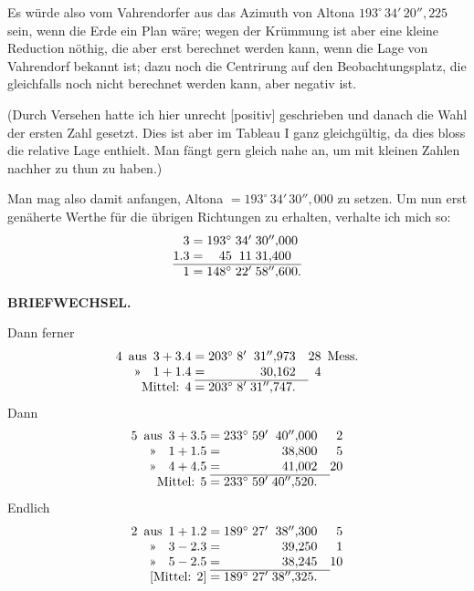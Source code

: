 Es würde also vom Vahrendorfer  aus das Azimuth von Altona \(193^\circ\,34'\,20''{,}225\) sein, wenn die Erde ein Plan wäre; wegen der Krümmung ist aber eine kleine Reduction nöthig, die aber erst berechnet werden kann, wenn die Lage von Vahrendorf bekannt ist; dazu noch die Centrirung auf den Beobachtungsplatz, die gleichfalls noch nicht berechnet werden kann, aber negativ ist.

(Durch Versehen hatte ich hier unrecht [positiv] geschrieben und danach die Wahl der ersten Zahl gesetzt. Dies ist aber im Tableau I ganz gleichgültig, da dies bloss die relative Lage enthielt. Man fängt gern gleich nahe an, um mit kleinen Zahlen nachher zu thun zu haben.)

Man mag also damit anfangen, Altona \(=193^\circ\,34'\,30''{,}000\) zu setzen. Um nun erst genäherte Werthe für die übrigen Richtungen zu erhalten, verhalte ich mich so:
\[
\begin{array}{@{}r@{\;=\;}r@{\;}r@{\;}l@{}}
 3&193^\circ&34'&30''{,}000\\
 1.3&45&11&31{,}400\\
 \hline
 1&148^\circ&22'&58''{,}600.
\end{array}
\]
\par\noindent\makebox[.86\linewidth][r]{36\textsuperscript{*}}\par

\par\clearpage
\noindent{}\hfill{\small\textbf{BRIEFWECHSEL.}}\hfill\null\par\medskip

Dann ferner
\[
\begin{array}{@{}r@{\enspace}c@{\enspace}r@{\;}c@{\;}r@{\;}r@{\;}r@{\quad}r@{\enspace}l@{}}
 4&\text{aus}&3+3.4&=&203^\circ&8'&31''{,}973&28&\text{Mess.}\\
 &\text{»}&1+1.4&=& &&30{,}162&4&\\
 \cline{4-7}
 \multicolumn{3}{r@{\;}}{\text{Mittel: }4}&=&203^\circ&8'&31''{,}747.& &
\end{array}
\]
\indent Dann
\[
\begin{array}{@{}r@{\enspace}c@{\enspace}r@{\;}c@{\;}r@{\;}r@{\;}r@{\quad}r@{}}
 5&\text{aus}&3+3.5&=&233^\circ&59'&40''{,}000&2\\
 &\text{»}&1+1.5&=& &&38{,}800&5\\
 &\text{»}&4+4.5&=& &&41{,}002&20\\
 \cline{4-7}
 \multicolumn{3}{r@{\;}}{\text{Mittel: }5}&=&233^\circ&59'&40''{,}520.&
\end{array}
\]
\indent Endlich
\[
\begin{array}{@{}r@{\enspace}c@{\enspace}r@{\;}c@{\;}r@{\;}r@{\;}r@{\quad}r@{}}
 2&\text{aus}&1+1.2&=&189^\circ&27'&38''{,}300&5\\
 &\text{»}&3-2.3&=& &&39{,}250&1\\
 &\text{»}&5-2.5&=& &&38{,}245&10\\
 \cline{4-7}
 \multicolumn{3}{r@{\;}}{\text{[Mittel: }2]}&=&189^\circ&27'&38''{,}325.&
\end{array}
\]

